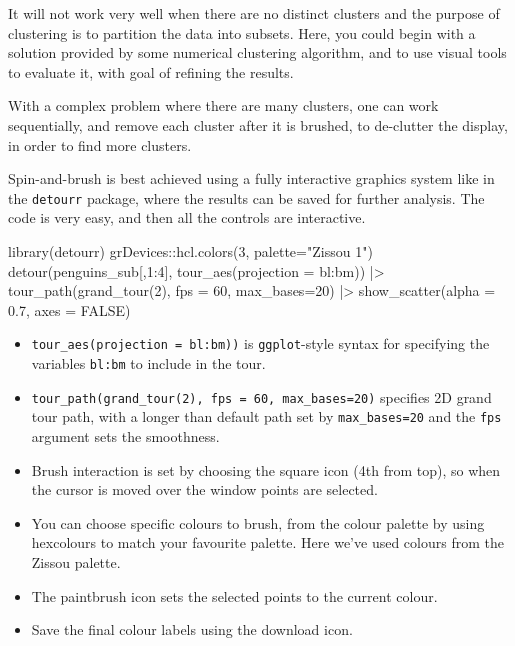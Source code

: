 \documentclass[
  letterpaper,
]{krantz}
\newenvironment{Shaded}{\begin{snugshade}}{\end{snugshade}}
\newcommand{\AttributeTok}[1]{\textcolor[rgb]{0.40,0.45,0.13}{#1}}
\newcommand{\ConstantTok}[1]{\textcolor[rgb]{0.56,0.35,0.01}{#1}}
\newcommand{\DecValTok}[1]{\textcolor[rgb]{0.68,0.00,0.00}{#1}}
\newcommand{\FloatTok}[1]{\textcolor[rgb]{0.68,0.00,0.00}{#1}}
\newcommand{\FunctionTok}[1]{\textcolor[rgb]{0.28,0.35,0.67}{#1}}
\newcommand{\NormalTok}[1]{\textcolor[rgb]{0.00,0.23,0.31}{#1}}
\newcommand{\SpecialCharTok}[1]{\textcolor[rgb]{0.37,0.37,0.37}{#1}}
\newcommand{\StringTok}[1]{\textcolor[rgb]{0.13,0.47,0.30}{#1}}
\providecommand{\tightlist}{%
  \setlength{\itemsep}{0pt}\setlength{\parskip}{0pt}}\usepackage{longtable,booktabs,array}
\begin{document}
It will not work very well when there are no distinct clusters and the
purpose of clustering is to partition the data into subsets. Here, you
could begin with a solution provided by some numerical clustering
algorithm, and to use visual tools to evaluate it, with goal of refining
the results.

With a complex problem where there are many clusters, one can work
sequentially, and remove each cluster after it is brushed, to de-clutter
the display, in order to find more clusters.

Spin-and-brush is best achieved using a fully interactive graphics
system like in the \texttt{detourr} package, where the results can be
saved for further analysis. The code is very easy, and then all the
controls are interactive.


\begin{Shaded}
\begin{Highlighting}[]
\FunctionTok{library}\NormalTok{(detourr)}
\NormalTok{grDevices}\SpecialCharTok{::}\FunctionTok{hcl.colors}\NormalTok{(}\DecValTok{3}\NormalTok{, }\AttributeTok{palette=}\StringTok{"Zissou 1"}\NormalTok{)}
\FunctionTok{detour}\NormalTok{(penguins\_sub[,}\DecValTok{1}\SpecialCharTok{:}\DecValTok{4}\NormalTok{], }
       \FunctionTok{tour\_aes}\NormalTok{(}\AttributeTok{projection =}\NormalTok{ bl}\SpecialCharTok{:}\NormalTok{bm)) }\SpecialCharTok{|\textgreater{}}
       \FunctionTok{tour\_path}\NormalTok{(}\FunctionTok{grand\_tour}\NormalTok{(}\DecValTok{2}\NormalTok{), }\AttributeTok{fps =} \DecValTok{60}\NormalTok{, }
                 \AttributeTok{max\_bases=}\DecValTok{20}\NormalTok{) }\SpecialCharTok{|\textgreater{}}
       \FunctionTok{show\_scatter}\NormalTok{(}\AttributeTok{alpha =} \FloatTok{0.7}\NormalTok{, }
                    \AttributeTok{axes =} \ConstantTok{FALSE}\NormalTok{)}
\end{Highlighting}
\end{Shaded}

\begin{itemize}
\tightlist
\item
  \texttt{tour\_aes(projection\ =\ bl:bm))} is \texttt{ggplot}-style
  syntax for specifying the variables \texttt{bl:bm} to include in the
  tour.
\item
  \texttt{tour\_path(grand\_tour(2),\ fps\ =\ 60,\ max\_bases=20)}
  specifies 2D grand tour path, with a longer than default path set by
  \texttt{max\_bases=20} and the \texttt{fps} argument sets the
  smoothness.
\item
  Brush interaction is set by choosing the square icon (4th from top),
  so when the cursor is moved over the window points are selected.
\item
  You can choose specific colours to brush, from the colour palette by
  using hexcolours to match your favourite palette. Here we've used
  colours from the Zissou palette.
\item
  The paintbrush icon sets the selected points to the current colour.
\item
  Save the final colour labels using the download icon.
\end{itemize}
\end{document}
